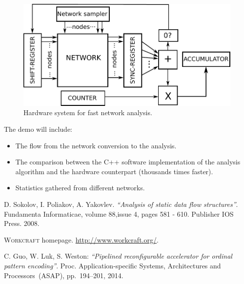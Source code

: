 \documentclass[conference]{IEEEtran}
\begin{document}
\begin{figure}[ht!]
\vspace{-3mm}
\begin{center}
	\includegraphics[width=\linewidth]{FIG/fantasi+.pdf}
	\caption{Hardware system for fast network analysis.}
	\label{fig:fantasi}
\end{center}
\vspace{-5mm}
\end{figure}
\noindent
The demo will include:
\begin{itemize}
\item The flow from the network conversion to the analysis.
\item The comparison between the C++ software implementation of the analysis algorithm and the
hardware counterpart (thousands times faster).
\item Statistics gathered from different networks.
\end{itemize}

\begin{thebibliography}{3}

	D. Sokolov, I. Poliakov, A. Yakovlev. \emph{``Analysis of static data flow structures''}.
	Fundamenta Informaticae, volume 88,issue 4, pages 581 - 610. Publisher IOS Press. 2008.

	\textsc{Workcraft} homepage. \url{http://www.workcraft.org/}.	

	C. Guo, W. Luk, S. Weston:
	\emph{``Pipelined reconfigurable accelerator for ordinal pattern encoding''}.
	Proc. Application-specific Systems, Architectures and Processors~(ASAP),
	pp.~194--201, 2014.

\end{thebibliography}
\end{document}
